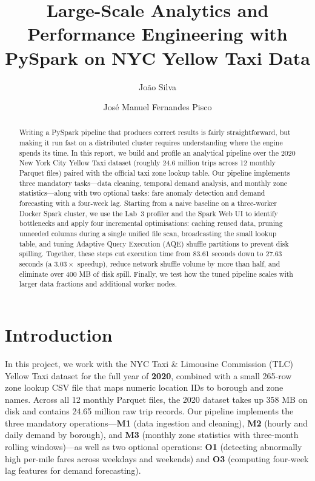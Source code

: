 \documentclass[sigconf,nonacm]{acmart}
\begin{document}
\title{Large-Scale Analytics and Performance Engineering with PySpark on NYC Yellow Taxi Data}

\author{Jo\~ao Silva}

\author{Jos\'e Manuel Fernandes Pisco}

\begin{abstract}
Writing a PySpark pipeline that produces correct results is fairly straightforward, but making it run fast on a distributed cluster requires understanding where the engine spends its time. In this report, we build and profile an analytical pipeline over the 2020 New York City Yellow Taxi dataset (roughly 24.6 million trips across 12 monthly Parquet files) paired with the official taxi zone lookup table. Our pipeline implements three mandatory tasks---data cleaning, temporal demand analysis, and monthly zone statistics---along with two optional tasks: fare anomaly detection and demand forecasting with a four-week lag. Starting from a naive baseline on a three-worker Docker Spark cluster, we use the Lab~3 profiler and the Spark Web UI to identify bottlenecks and apply four incremental optimisations: caching reused data, pruning unneeded columns during a single unified file scan, broadcasting the small lookup table, and tuning Adaptive Query Execution (AQE) shuffle partitions to prevent disk spilling. Together, these steps cut execution time from 83.61 seconds down to 27.63 seconds (a $3.03\times$ speedup), reduce network shuffle volume by more than half, and eliminate over 400 MB of disk spill. Finally, we test how the tuned pipeline scales with larger data fractions and additional worker nodes.
\end{abstract}


\maketitle

\section{Introduction}

In this project, we work with the NYC Taxi \& Limousine Commission (TLC) Yellow Taxi dataset \cite{nyctlc2026} for the full year of \textbf{2020}, combined with a small 265-row zone lookup CSV file that maps numeric location IDs to borough and zone names. Across all 12 monthly Parquet files, the 2020 dataset takes up 358 MB on disk and contains 24.65 million raw trip records. Our pipeline implements the three mandatory operations---\textbf{M1} (data ingestion and cleaning), \textbf{M2} (hourly and daily demand by borough), and \textbf{M3} (monthly zone statistics with three-month rolling windows)---as well as two optional operations: \textbf{O1} (detecting abnormally high per-mile fares across weekdays and weekends) and \textbf{O3} (computing four-week lag features for demand forecasting).
\end{document}
